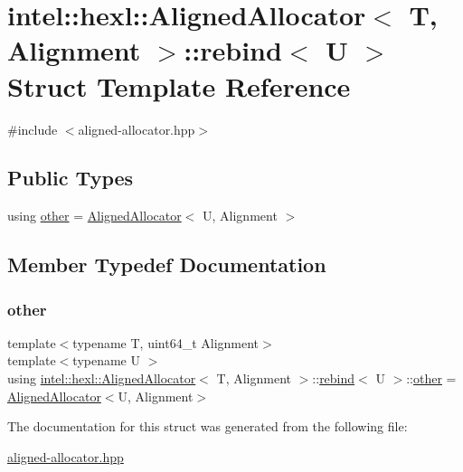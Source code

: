 \hypertarget{structintel_1_1hexl_1_1AlignedAllocator_1_1rebind}{}\section{intel\+:\+:hexl\+:\+:Aligned\+Allocator$<$ T, Alignment $>$\+:\+:rebind$<$ U $>$ Struct Template Reference}
\label{structintel_1_1hexl_1_1AlignedAllocator_1_1rebind}


{\ttfamily \#include $<$aligned-\/allocator.\+hpp$>$}

\subsection*{Public Types}
\begin{DoxyCompactItemize}
\item 
using \hyperlink{structintel_1_1hexl_1_1AlignedAllocator_1_1rebind_ac2db56c3df1c9b8ed9e8a6423a65a22e}{other} = \hyperlink{classintel_1_1hexl_1_1AlignedAllocator}{Aligned\+Allocator}$<$ U, Alignment $>$
\end{DoxyCompactItemize}


\subsection{Member Typedef Documentation}
\mbox{\label{structintel_1_1hexl_1_1AlignedAllocator_1_1rebind_ac2db56c3df1c9b8ed9e8a6423a65a22e}} 
\subsubsection{\texorpdfstring{other}{other}}
{\footnotesize\ttfamily template$<$typename T, uint64\+\_\+t Alignment$>$ \\
template$<$typename U $>$ \\
using \hyperlink{classintel_1_1hexl_1_1AlignedAllocator}{intel\+::hexl\+::\+Aligned\+Allocator}$<$ T, Alignment $>$\+::\hyperlink{structintel_1_1hexl_1_1AlignedAllocator_1_1rebind}{rebind}$<$ U $>$\+::\hyperlink{structintel_1_1hexl_1_1AlignedAllocator_1_1rebind_ac2db56c3df1c9b8ed9e8a6423a65a22e}{other} =  \hyperlink{classintel_1_1hexl_1_1AlignedAllocator}{Aligned\+Allocator}$<$U, Alignment$>$}



The documentation for this struct was generated from the following file\+:\begin{DoxyCompactItemize}
\item 
\hyperlink{aligned-allocator_8hpp}{aligned-\/allocator.\+hpp}\end{DoxyCompactItemize}
